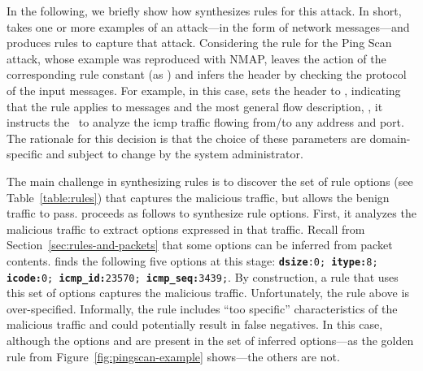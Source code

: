 \documentclass[sigconf,review, anonymous]{acmart}
\begin{document}
In the following, we briefly show how \tname{} synthesizes rules for
this attack. In short, \tname{} takes one or more examples of an
attack---in the form of network messages---and produces rules to
capture that attack. Considering the rule for the Ping Scan attack,
whose example was reproduced with NMAP, \tname{} leaves the action of
the corresponding rule constant (as ) and infers the
header by checking the protocol of the input messages. For example, in
this case, \tname{} sets the header to , indicating that the rule applies to  messages and
the most general flow description, \ie{}, it instructs the \nids\ to
analyze the icmp traffic flowing from/to any address and port.  The
rationale for this decision is that the choice of these parameters are
domain-specific and subject to change by the system administrator.

The main challenge in synthesizing rules is to discover the set of
rule options (see Table~\ref{table:rules}) that captures the malicious
traffic, but allows the benign traffic to pass. \tname{} proceeds as
follows to synthesize rule options. First, it analyzes the malicious
traffic to extract options expressed in that traffic. Recall from
Section~\ref{sec:rules-and-packets} that some options can be inferred
from packet contents. \tname{} finds the following five options at
this stage: {\scriptsize{\texttt{\textbf{dsize}:0; \textbf{itype:}8;
      \textbf{icode:}0; \textbf{icmp\_id:}23570;
      \textbf{icmp\_seq:}3439;}}}.  By construction, a rule that uses
this set of options captures the malicious traffic. Unfortunately, the
rule above is over-specified. Informally, the rule includes ``too
specific'' characteristics of the malicious traffic and could
potentially result in false negatives. In this case, although the
options  and  are present in the set
of inferred options---as the golden rule from
Figure~\ref{fig:pingscan-example} shows---the others are not.

\end{document}

